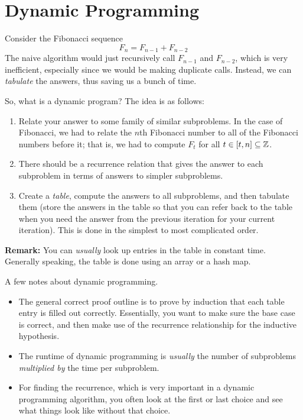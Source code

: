 \documentclass[letterpaper]{article}
\begin{document}
\section{Dynamic Programming}
Consider the Fibonacci sequence 
\[F_n = F_{n - 1} + F_{n - 2}\]
The naive algorithm would just recursively call $F_{n - 1}$ and $F_{n - 2}$, which is very inefficient, especially since we would be making duplicate calls. Instead, we can \emph{tabulate} the answers, thus saving us a bunch of time. 

\bigskip 

So, what is a dynamic program? The idea is as follows: 
\begin{enumerate}
    \item Relate your answer to some family of similar subproblems. In the case of Fibonacci, we had to relate the $n$th Fibonacci number to all of the Fibonacci numbers before it; that is, we had to compute $F_t$ for all $t \in [t, n] \subseteq \mathbb{Z}$.
    \item There should be a recurrence relation that gives the answer to each subproblem in terms of answers to simpler subproblems. 
    \item Create a \emph{table}, compute the answers to all subproblems, and then tabulate them (store the answers in the table so that you can refer back to the table when you need the answer from the previous iteration for your current iteration). This is done in the simplest to most complicated order. 
\end{enumerate}
\textbf{Remark:} You can \emph{usually} look up entries in the table in constant time. Generally speaking, the table is done using an array or a hash map. 

\bigskip 

A few notes about dynamic programming. 
\begin{itemize}
    \item The general correct proof outline is to prove by induction that each table entry is filled out correctly. Essentially, you want to make sure the base case is correct, and then make use of the recurrence relationship for the inductive hypothesis.
    \item The runtime of dynamic programming is \emph{usually} the number of subproblems \emph{multiplied by} the time per subproblem. 
    \item For finding the recurrence, which is very important in a dynamic programming algorithm, you often look at the first or last choice and see what things look like without that choice.
\end{itemize}
\end{document}
